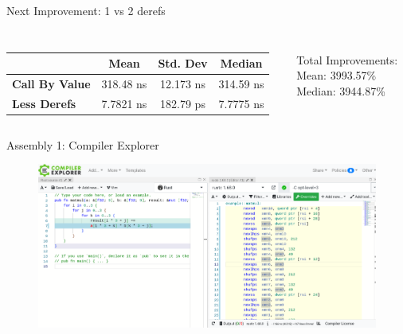\documentclass[compress,aspectratio=169]{beamer}
\begin{document}
\begin{frame}{Next Improvement: 1 vs 2 derefs}
  \begin{tcolorbox}[title=Reduce the amount of Dereferences]
    \footnotesize\inputminted[xleftmargin=1em,linenos]{rust}{../assets/less_derefs.rs}
  \end{tcolorbox}
  \begin{columns}
    \begin{column}{0.7\textwidth}
  \begin{table}[h]
    \centering
    \begin{tabular}{|l|c|c|c|}
      \hline
      &\textbf{Mean} & \textbf{Std. Dev} & \textbf{Median}\\
      \hline
      \textbf{Call By Value} & 318.48 ns & 12.173 ns & 314.59 ns \\
      \hline
      \textbf{Less Derefs} & 7.7821 ns & 182.79 ps & 7.7775 ns \\
      \hline
      \end{tabular}
  \end{table}
    \end{column}
    \begin{column}{0.3\textwidth}
      Total Improvements:\\
      Mean: 3993.57\%\\
      Median: 3944.87\%
    \end{column}
  \end{columns}
\end{frame}

\begin{frame}{Assembly 1: Compiler Explorer \cite{godbolt}}
  \begin{figure}[h]
    \includegraphics[width=\textwidth]{../assets/compilerexplorer.png}
  \end{figure}
\end{frame}
\end{document}

